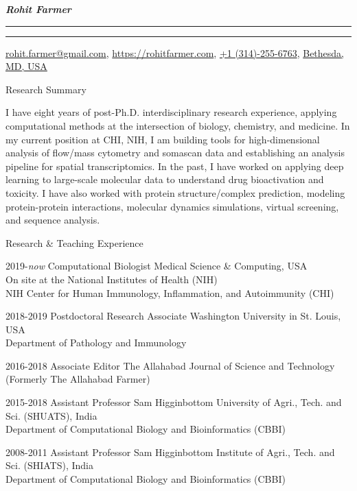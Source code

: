 \documentclass[10pt]{article}
\begin{document}
\settowidth{\cvlabelwidth}{%
\cvlabelfont 2009-2009%
}%
\begin{cv}{\huge \it \bfseries Rohit Farmer}
\vskip3pt
\hrule\hrule
\vskip3pt
\hfill \url{rohit.farmer@gmail.com},  \url{https://rohitfarmer.com}, \url{+1 (314)-255-6763}, \url{Bethesda, } \url{MD, USA}

{
\setlength{\cvlabelsep}{0mm}
\setlength{\cvlabelwidth}{0mm}
\begin{cvlist}{Research Summary}
	\item I have eight years of post-Ph.D. interdisciplinary research experience, applying computational methods at the intersection of biology, chemistry, and medicine. In my current position at CHI, NIH, I am building tools for high-dimensional analysis of flow/mass cytometry and somascan data and establishing an analysis pipeline for spatial transcriptomics. In the past, I have worked on applying deep learning to large-scale molecular data to understand drug bioactivation and toxicity. I have also worked with protein structure/complex prediction, modeling protein-protein interactions, molecular dynamics simulations, virtual screening, and sequence analysis. \end{cvlist}
}

\begin{cvlist}{Research \& Teaching Experience}
        \item[2019-\emph{now}] Computational Biologist \hfill Medical Science \& Computing, USA\\ \hspace*{\fill}On site at the National Institutes of Health (NIH)\\ \hspace*{\fill} NIH Center for Human Immunology, Inflammation, and Autoimmunity (CHI)
	\item[2018-2019] Postdoctoral Research Associate \hfill Washington University in St. Louis, USA\\  \hspace*{\fill} Department of Pathology and Immunology
	\item[2016-2018] Associate Editor \hfill The Allahabad Journal of Science and Technology \\  \hspace*{\fill} (Formerly The Allahabad Farmer)
        \item[2015-2018] Assistant Professor \hfill Sam Higginbottom University of Agri., Tech. and Sci. (SHUATS), India\\  \hspace*{\fill} Department of Computational Biology and Bioinformatics (CBBI)
        \item[2008-2011] Assistant Professor \hfill Sam Higginbottom Institute of Agri., Tech. and Sci. (SHIATS), India\\  \hspace*{\fill} Department of Computational Biology and Bioinformatics (CBBI)
\end{cvlist}


\end{cv}
\end{document}

